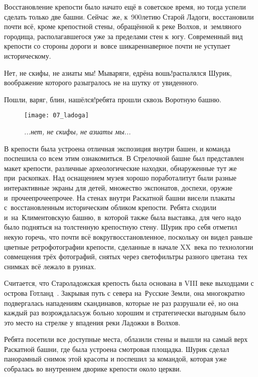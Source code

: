 Восстановление крепости было начато ещё в советское время, но тогда успели сделать только две башни. Сейчас~же, к~900\sdash летию Старой Ладоги, восстановили почти всё, кроме крепостной стены, обращённой к реке Волхов, и~земляного городища, располагавшегося уже за пределами стен к~югу. Современный вид крепости со стороны дороги и~вовсе шикарен\mdash наверное почти не уступает историческому. 

\diagdash Нет, не скифы, не азиаты мы! Мы\mdash варяги, едрёна вошь!\mdash распалялся Шурик, воображение которого разыгралось не на шутку от увиденного.

\diagdash Пошли, варяг, блин, нашёлся!\mdash ребята прошли сквозь Воротную башню.

{
	\begin{figure}[h]
		\centering
		\texttt{[image: 07\_ladoga]}
		\caption{\small\textit{...нет, не скифы, не азиаты мы...}}
	\end{figure}
}

В крепости была устроена отличная экспозиция внутри башен, и команда поспешила со всем этим ознакомиться. В Стрелочной башне был представлен макет крепости, различные археологические находки, обнаруженные тут же при~раскопках. Над оснащением музея хорошо поработали\mdash тут были разные интерактивные экраны для детей, множество экспонатов, доспехи, оружие и~прочее\sdash прочее\sdash прочее. На стенах внутри Раскатной башни висели плакаты с~восстановленным историческим обликом крепости. Ребята сходили и~на~Климентовскую башню, в~которой также была выставка, для чего надо было подняться на толстенную крепостную стену. Шурик про себя отметил некую горечь, что почти всё вокруг\mdash восстановленное, поскольку он видел раньше цветные ретро\sdash фотографии крепости, сделанные в начале XX~века по технологии совмещения трёх фотографий, снятых через светофильтры разного цвета\cite{ПрокудинГорский}\mdash на~тех снимках всё лежало в руинах.

Считается, что Староладожская крепость была основана в VIII веке выходцами с острова Готланд~\cite{ЛебедевЛадога}. Закрывая путь с севера на~Русские Земли, она многократно подвергалась нападениям скандинавов, которые не раз разрушали её, но она каждый раз возрождалась\mdash уж больно хорошим и стратегически выгодным было это место на стрелке у впадения реки Ладожки в Волхов.

Ребята посетили все доступные места, облазили стены и вышли на самый верх Раскатной башни, где была устроена смотровая площадка. Шурик сделал панорамный снимок этой красоты и поспешил за командой, которая уже собралась во внутреннем дворике крепости около церкви.

